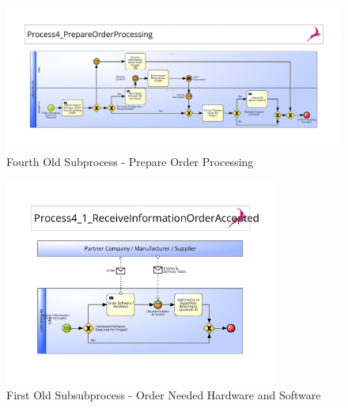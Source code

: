 \begin{figure}[h]
	\begin{center}
		\includegraphics[width=\textheight,angle=90]{./appendix/pbmnOld/0-4_orderProcessing.pdf}
		\caption{Fourth Old Subprocess - Prepare Order Processing}\label{fig:0-4_sub}
	\end{center}
\end{figure}

\begin{figure}[h]
	\begin{center}
		\includegraphics[width=0.8\textwidth]{./appendix/pbmnOld/0-4-1_orderSoftware.pdf}
		\caption{First Old Subsubprocess - Order Needed Hardware and Software}\label{fig:0-4-1_subsub}
	\end{center}
\end{figure}